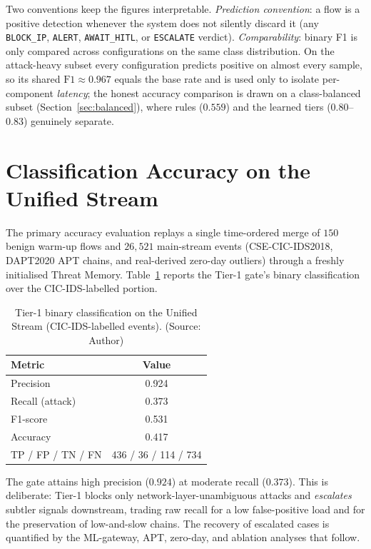 Two conventions keep the figures interpretable. \emph{Prediction convention}: a flow is a positive detection whenever the system does not silently discard it (any \texttt{BLOCK\_IP}, \texttt{ALERT}, \texttt{AWAIT\_HITL}, or \texttt{ESCALATE} verdict). \emph{Comparability}: binary F1 is only compared across configurations on the same class distribution. On the attack-heavy subset every configuration predicts positive on almost every sample, so its shared $\mathrm{F1}\!\approx\!0.967$ equals the base rate and is used only to isolate per-component \emph{latency}; the honest accuracy comparison is drawn on a class-balanced subset (Section~\ref{sec:balanced}), where rules ($0.559$) and the learned tiers ($0.80$--$0.83$) genuinely separate.

\section{Classification Accuracy on the Unified Stream}
The primary accuracy evaluation replays a single time-ordered merge of $150$ benign warm-up flows and $26{,}521$ main-stream events (CSE-CIC-IDS2018, DAPT2020 APT chains, and real-derived zero-day outliers) through a freshly initialised Threat Memory. Table~\ref{tab:classification} reports the Tier-1 gate's binary classification over the CIC-IDS-labelled portion.

\begin{table}[!htbp]
    \centering
    \caption{Tier-1 binary classification on the Unified Stream (CIC-IDS-labelled events). (Source: Author)}
    \label{tab:classification}
    \begin{tabular}{|l|c|}
        \hline
        \textbf{Metric} & \textbf{Value} \\ \hline
        Precision & 0.924 \\ \hline
        Recall (attack) & 0.373 \\ \hline
        F1-score & 0.531 \\ \hline
        Accuracy & 0.417 \\ \hline
        TP / FP / TN / FN & 436 / 36 / 114 / 734 \\ \hline
    \end{tabular}
\end{table}

The gate attains high precision ($0.924$) at moderate recall ($0.373$). This is deliberate: Tier-1 blocks only network-layer-unambiguous attacks and \emph{escalates} subtler signals downstream, trading raw recall for a low false-positive load and for the preservation of low-and-slow chains. The recovery of escalated cases is quantified by the ML-gateway, APT, zero-day, and ablation analyses that follow.

